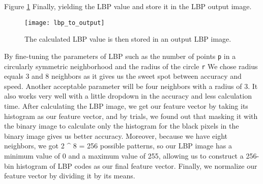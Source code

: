 Figure \ref{fig:lbp_to_output} Finally, yielding the LBP value and store it in the LBP output image.
\begin{figure}
    \centering
    \texttt{[image: lbp\_to\_output]}
    \caption{The calculated LBP value is then stored in an output LBP image.}
    \label{fig:lbp_to_output}
\end{figure}

By fine-tuning the parameters of LBP such as the number of points \texttt{p} in a circularly symmetric neighborhood and the radius of the circle \texttt{r}
We chose radius equals 3 and 8 neighbors as it gives us the sweet spot between accuracy and speed. Another acceptable parameter will be four neighbors with a radius of 3. It also works very well with a little dropdown in the accuracy and less calculation time.
After calculating the LBP image, we get our feature vector by taking its histogram as our feature vector, and by trials, we found out that masking it with the binary image to calculate only the histogram for the black pixels in the binary image gives us better accuracy.
Moreover, because we have eight neighbors, we got 2 ^ 8 = 256 possible patterns, so our LBP image has a minimum value of 0 and a maximum value of 255, allowing us to construct a 256-bin histogram of LBP codes as our final feature vector.
Finally, we normalize our feature vector by dividing it by its means.